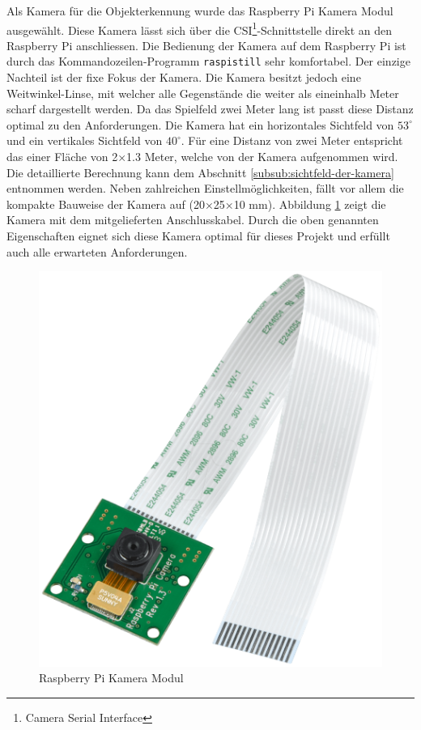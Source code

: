 Als Kamera für die Objekterkennung wurde das Raspberry Pi Kamera Modul ausgewählt. Diese Kamera lässt sich über die CSI\footnote{Camera Serial Interface}-Schnittstelle direkt an den Raspberry Pi anschliessen. Die Bedienung der Kamera auf dem Raspberry Pi ist durch das Kommandozeilen-Programm \verb|raspistill| sehr komfortabel. Der einzige Nachteil ist der fixe Fokus der Kamera. Die Kamera besitzt jedoch eine Weitwinkel-Linse, mit welcher alle Gegenstände die weiter als eineinhalb Meter scharf dargestellt werden. Da das Spielfeld zwei Meter lang ist passt diese Distanz optimal zu den Anforderungen. Die Kamera hat ein horizontales Sichtfeld von $53^\circ$ und ein vertikales Sichtfeld von $40^\circ$. Für eine Distanz von zwei Meter entspricht das einer Fläche von 2×1.3 Meter, welche von der Kamera aufgenommen wird. Die detaillierte Berechnung kann dem Abschnitt \ref{subsub:sichtfeld-der-kamera} entnommen werden. Neben zahlreichen Einstellmöglichkeiten, fällt vor allem die kompakte Bauweise der Kamera auf (20×25×10 mm). Abbildung \ref{fig:raspberry_pi_cam} zeigt die Kamera mit dem mitgelieferten Anschlusskabel. Durch die oben genannten Eigenschaften eignet sich diese Kamera optimal für dieses Projekt und erfüllt auch alle erwarteten Anforderungen.

\begin{figure}[h!]
\centering
\includegraphics[angle=90,width=0.3\linewidth]{../../fig/raspberry_pi_cam}
\caption{Raspberry Pi Kamera Modul}
\label{fig:raspberry_pi_cam}
\end{figure}
